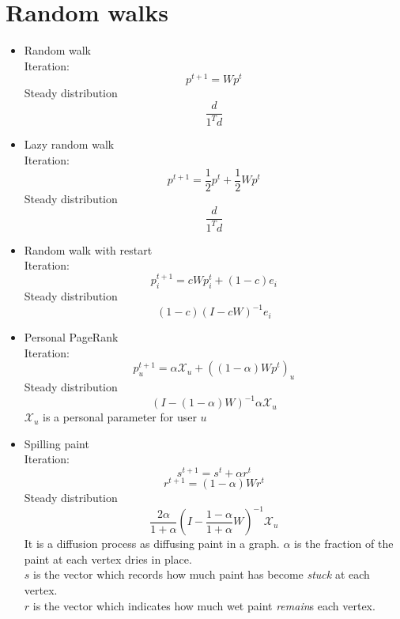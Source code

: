 \section{Random walks}


\begin{itemize}
    \item Random walk \\
    Iteration:
    \[
        p^{t+1}=Wp^t
    \]
    Steady distribution 
    \[
    \frac{d}{1^Td}
    \]
    
    \item Lazy random walk \\
    Iteration:
    \[
       p^{t+1}=\frac{1}{2}p^t +\frac{1}{2}Wp^t
    \]
    Steady distribution 
    \[
    \frac{d}{1^Td}
    \]
    
     \item Random walk with restart \\
    Iteration:
    \[
       p_i^{t+1} =cWp_i^{t}+(1-c)e_i
    \]
    Steady distribution 
    \[
     (1-c)(I-cW)^{-1}e_i
    \]
    
     \item Personal PageRank  \\
    Iteration:
    \[
       p^{t+1}_u =\alpha \mathcal{X}_u+((1-\alpha)Wp^t)_u
    \]
    Steady distribution 
    \[
     (I-(1-\alpha)W)^{-1}\alpha \mathcal{X}_u
    \]
    $\mathcal{X}_u$ is a personal parameter for user $u$
     \item Spilling paint  \\
    Iteration:
    \[
    s^{t+1}=s^t+\alpha r^t
    \]
    \[
    r^{t+1}=(1-\alpha)Wr^t
    \]
    Steady distribution 
    \[
     \frac{2\alpha}{1+\alpha}(I-\frac{1-\alpha}{1+\alpha}W)^{-1}\mathcal{X}_u
    \]
    It is a diffusion process as diffusing paint in a graph. $\alpha$ is the fraction of the paint at each vertex dries in place.\\
    $s$ is the vector which records how much paint has become \textit{stuck} at each vertex.\\
    $r$ is the vector which indicates how much wet paint \textit{remain}s each vertex.
    
\end{itemize}



